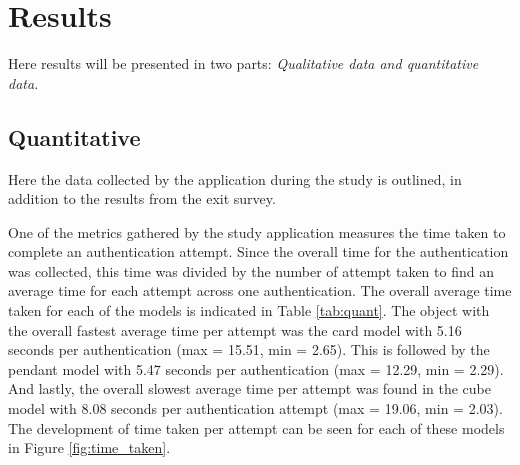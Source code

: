 \documentclass{l4proj}
\begin{document}
\begin{table}[]

\label{tab:demographics}
\caption{Demographics information for the participants collected in the initial meeting during the study.}
\end{table}

\section{Results}

Here results will be presented in two parts: \textit{Qualitative data and quantitative data.}

\subsection{Quantitative}
Here the data collected by the application during the study is outlined, in addition to the results from the exit survey.

One of the metrics gathered by the study application measures the time taken to complete an authentication attempt. Since the overall time for the authentication was collected, this time was divided by the number of attempt taken to find an average time for each attempt across one authentication. The overall average time taken for each of the models is indicated in Table \ref{tab:quant}. The object with the overall fastest average time per attempt was the card model with 5.16 seconds per authentication (max = 15.51, min = 2.65). This is followed by the pendant model with 5.47 seconds per authentication (max = 12.29, min = 2.29). And lastly, the overall slowest average time per attempt was found in the cube model with 8.08 seconds per authentication attempt (max = 19.06, min = 2.03). The development of time taken per attempt can be seen for each of these models in Figure \ref{fig:time_taken}.
\end{document}
